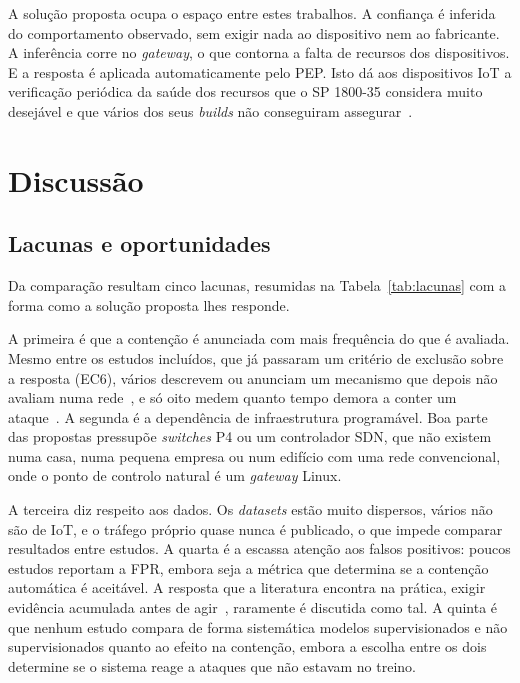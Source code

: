 \documentclass[conference,a4paper]{IEEEtran}
\begin{document}
A solução proposta ocupa o espaço entre estes trabalhos. A confiança é inferida do
comportamento observado, sem exigir nada ao dispositivo nem ao fabricante. A inferência
corre no \textit{gateway}, o que contorna a falta de recursos dos dispositivos. E a
resposta é aplicada automaticamente pelo PEP. Isto dá aos dispositivos IoT a verificação
periódica da saúde dos recursos que o SP 1800-35 considera muito desejável e que vários
dos seus \textit{builds} não conseguiram assegurar~\cite{nccoe2025zta}.

\section{Discussão}\label{sec:discussao}
\subsection{Lacunas e oportunidades}
Da comparação resultam cinco lacunas, resumidas na Tabela~\ref{tab:lacunas} com a forma
como a solução proposta lhes responde.

A primeira é que a contenção é anunciada com mais frequência do que é avaliada. Mesmo
entre os estudos incluídos, que já passaram um critério de exclusão sobre a resposta
(EC6), vários descrevem ou anunciam um mecanismo que depois não avaliam numa
rede~\cite{dange2025dual,tawfik2021internet,saurabh2022mlaps,rawat2024intelligent,hussain2026postquantum,kumar2025advanced},
e só oito medem quanto tempo demora a conter um
ataque~\cite{ramirezmartinez2025p4,andrade2024ddos,kponyo2020lightweight,karam2025isaaf,toony2024multiblock,srilekha2025hybrid,shukla2026cyber,Rasheed2026}.
A segunda é a dependência de infraestrutura programável. Boa parte das propostas
pressupõe \textit{switches} P4 ou um controlador SDN, que não existem numa casa, numa
pequena empresa ou num edifício com uma rede convencional, onde o ponto de controlo
natural é um \textit{gateway} Linux.

A terceira diz respeito aos dados. Os \textit{datasets} estão muito dispersos, vários
não são de IoT, e o tráfego próprio quase nunca é publicado, o que impede comparar
resultados entre estudos. A quarta é a escassa atenção aos falsos positivos: poucos
estudos reportam a FPR, embora seja a métrica que determina se a contenção automática é
aceitável. A resposta que a literatura encontra na prática, exigir evidência acumulada
antes de agir~\cite{ramirezmartinez2025p4,andrade2024ddos}, raramente é discutida
como tal. A quinta é que nenhum estudo compara de forma sistemática modelos
supervisionados e não supervisionados quanto ao efeito na contenção, embora a escolha
entre os dois determine se o sistema reage a ataques que não estavam no treino.
\end{document}
